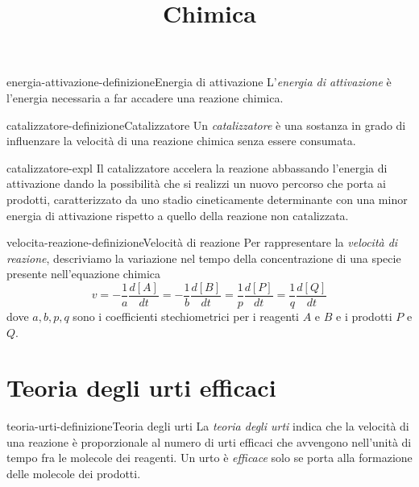 \documentclass[preview]{standalone}
\begin{document}
\title{Chimica}
\genpage

\begin{snippetdefinition}{energia-attivazione-definizione}{Energia di attivazione}
    L'\textit{energia di attivazione} è l'energia necessaria
    a far accadere una reazione chimica.
\end{snippetdefinition}

\begin{snippetdefinition}{catalizzatore-definizione}{Catalizzatore}
    Un \textit{catalizzatore} è
    una sostanza in grado di influenzare la
    velocità di una reazione chimica senza essere consumata.
\end{snippetdefinition}

\begin{snippet}{catalizzatore-expl}
    Il catalizzatore accelera la reazione abbassando l'energia
di attivazione dando la possibilità che si realizzi un nuovo
percorso che porta ai prodotti, caratterizzato da uno stadio
cineticamente determinante con una minor energia di
attivazione rispetto a quello della reazione non catalizzata.
\end{snippet}

\begin{snippetdefinition}{velocita-reazione-definizione}{Velocità di reazione}
    Per rappresentare la \textit{velocità di reazione}, descriviamo la
    variazione nel tempo della concentrazione di una specie
    presente nell'equazione chimica
    \[
        v
        = - \frac{1}{a} \frac{d[A]}{dt}
        = - \frac{1}{b} \frac{d[B]}{dt}
        = \frac{1}{p} \frac{d[P]}{dt}
        = \frac{1}{q} \frac{d[Q]}{dt}
    \]
    dove \(a,b,p,q\) sono i coefficienti stechiometrici
    per i reagenti \(A\) e \(B\) e i prodotti \(P\) e \(Q\).
\end{snippetdefinition}

\section{Teoria degli urti efficaci}

\begin{snippetdefinition}{teoria-urti-definizione}{Teoria degli urti}
    La \textit{teoria degli urti}
    indica che 
    la velocità di una reazione è
    proporzionale al numero di urti efficaci che avvengono
    nell'unità di tempo fra le molecole dei reagenti.
    Un urto è \textit{efficace} solo se porta alla formazione delle
    molecole dei prodotti.
\end{snippetdefinition}
\end{document}
